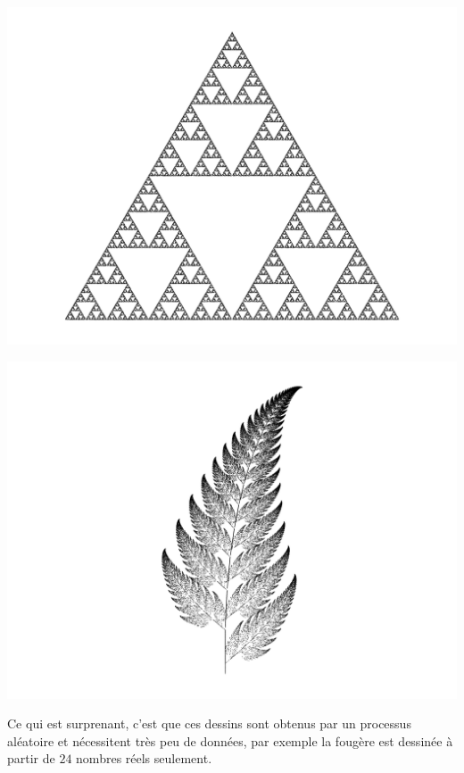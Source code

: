 \documentclass[11pt,class=report,crop=false]{standalone}
\begin{document}
\begin{center}

\begin{minipage}{0.4\textwidth}
\includegraphics[scale=\myscale,scale=0.4,trim={1cm 0 1cm 0},clip]{figures/ifs-02}
\end{minipage}\quad
\begin{minipage}{0.3\textwidth}
\includegraphics[scale=\myscale,scale=0.6,trim={5cm 0 5cm 0},clip]{figures/ifs-01}
\end{minipage}

\end{center}

Ce qui est surprenant, c'est que ces dessins sont obtenus par un processus aléatoire et  nécessitent très peu de données, par exemple la fougère est dessinée à partir de $24$ nombres réels seulement.
 
\end{document}
